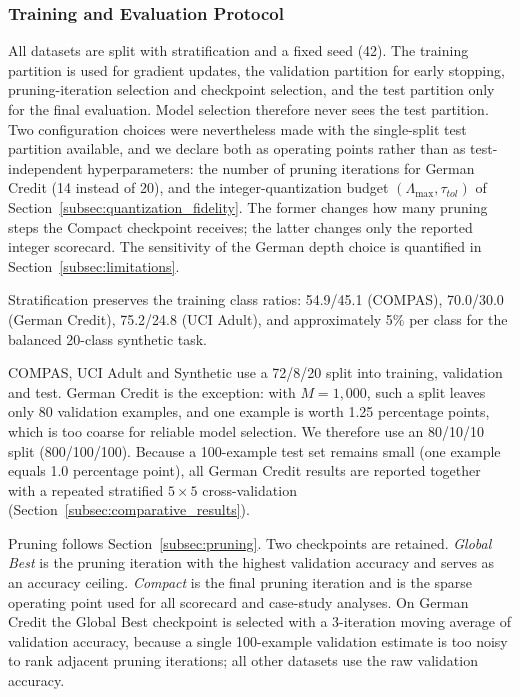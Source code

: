 \subsubsection{Training and Evaluation Protocol}
\label{subsubsec:protocol}
All datasets are split with stratification and a fixed seed (42). The training
partition is used for gradient updates, the validation partition for early
stopping, pruning-iteration selection and checkpoint selection, and the test
partition only for the final evaluation. Model selection therefore never sees the
test partition. Two configuration choices were nevertheless made with the
single-split test partition available, and we declare both as operating points
rather than as test-independent hyperparameters: the number of pruning iterations
for German Credit (14 instead of 20), and the integer-quantization budget
$(\Lambda_{\max}, \tau_{tol})$ of
Section~\ref{subsec:quantization_fidelity}. The former changes how many pruning
steps the Compact checkpoint receives; the latter changes only the reported
integer scorecard. The sensitivity of the German depth choice is quantified in
Section~\ref{subsec:limitations}.

Stratification preserves the training class
ratios: 54.9/45.1 (COMPAS), 70.0/30.0 (German Credit), 75.2/24.8 (UCI Adult), and
approximately 5\% per class for the balanced 20-class synthetic task.

COMPAS, UCI Adult and Synthetic use a 72/8/20 split into training, validation
and test. German Credit is the exception: with $M = 1{,}000$, such a split
leaves only 80 validation examples, and one example is worth 1.25 percentage
points, which is too coarse for reliable model selection. We therefore use an 80/10/10 split
(800/100/100). Because a 100-example test set remains small (one example equals
1.0 percentage point), all German Credit results are reported together with a
repeated stratified $5\times5$ cross-validation
(Section~\ref{subsec:comparative_results}).

Pruning follows Section~\ref{subsec:pruning}. Two checkpoints are retained.
\emph{Global Best} is the pruning iteration with the highest validation accuracy
and serves as an accuracy ceiling. \emph{Compact} is the final pruning iteration
and is the sparse operating point used for all scorecard and case-study analyses.
On German Credit the Global Best checkpoint is selected with a 3-iteration moving
average of validation accuracy, because a single 100-example validation estimate
is too noisy to rank adjacent pruning iterations; all other datasets use the raw
validation accuracy.

